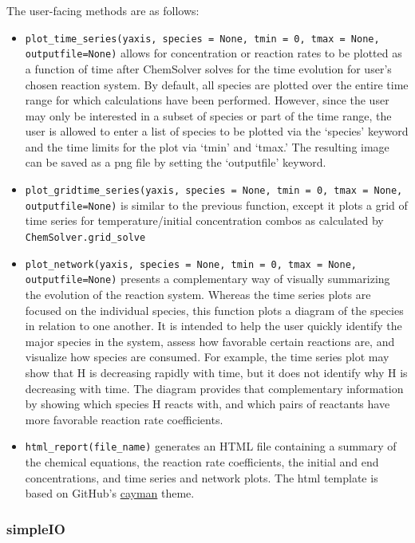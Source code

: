 \documentclass[12pt]{article}
\begin{document}
The user-facing methods are as follows: 
\begin{itemize}
\item \texttt{plot\_time\_series(yaxis, species = None, tmin = 0, tmax = None, outputfile=None)} allows for concentration or reaction rates to be plotted as a function of time after ChemSolver solves for the time evolution for user's chosen reaction system. By default, all species are plotted over the entire time range for which calculations have been performed. However, since the user may only be interested in a subset of species or part of the time range, the user is allowed to enter a list of species to be plotted via the `species' keyword and the time limits for the plot via `tmin' and `tmax.' The resulting image can be saved as a png file by setting the `outputfile' keyword. 
\item \texttt{plot\_gridtime\_series(yaxis, species = None, tmin = 0, tmax = None, outputfile=None)} is similar to the previous function, except it plots a grid of time series for temperature/initial concentration combos as calculated by \texttt{ChemSolver.grid\_solve}
\item \texttt{plot\_network(yaxis, species = None, tmin = 0, tmax = None, outputfile=None)} presents a complementary way of visually summarizing the evolution of the reaction system. Whereas the time series plots are focused on the individual species, this function plots a diagram of the species in relation to one another. It is intended to help the user quickly identify the major species in the system, assess how favorable certain reactions are, and visualize how species are consumed. For example, the time series plot may show that H is decreasing rapidly with time, but it does not identify why H is decreasing with time. The diagram provides that complementary information by showing which species H reacts with, and which pairs of reactants have more favorable reaction rate coefficients. 
\item \texttt{html\_report(file\_name)} generates an HTML file containing a summary of the chemical equations, the reaction rate coefficients, the initial and end concentrations, and time series and network plots. The html template is based on GitHub's \href{https://github.com/pages-themes/cayman}{cayman} theme.
\end{itemize}

\subsubsection{simpleIO}
\end{document}
